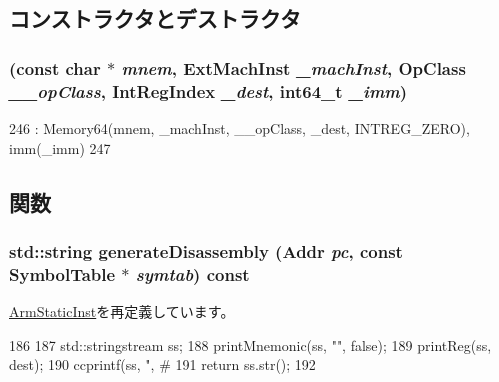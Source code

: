 \subsection{コンストラクタとデストラクタ}
\hypertarget{classArmISA_1_1MemoryLiteral64_a7025e91fe637b31678be253b3d3e6f69}{
\subsubsection[{MemoryLiteral64}]{ (const char $\ast$ {\em mnem}, \/  {\bf ExtMachInst} {\em \_\-machInst}, \/  OpClass {\em \_\-\_\-opClass}, \/  {\bf IntRegIndex} {\em \_\-dest}, \/  int64\_\-t {\em \_\-imm})}}
\label{classArmISA_1_1MemoryLiteral64_a7025e91fe637b31678be253b3d3e6f69}



\begin{DoxyCode}
246         : Memory64(mnem, _machInst, __opClass, _dest, INTREG_ZERO), imm(_imm)
247     {}
\end{DoxyCode}


\subsection{関数}
\hypertarget{classArmISA_1_1MemoryLiteral64_a95d323a22a5f07e14d6b4c9385a91896}{
\subsubsection[{generateDisassembly}]{\setlength{\rightskip}{0pt plus 5cm}std::string generateDisassembly ({\bf Addr} {\em pc}, \/  const SymbolTable $\ast$ {\em symtab}) const}}
\label{classArmISA_1_1MemoryLiteral64_a95d323a22a5f07e14d6b4c9385a91896}


\hyperlink{classArmISA_1_1ArmStaticInst_a95d323a22a5f07e14d6b4c9385a91896}{ArmStaticInst}を再定義しています。


\begin{DoxyCode}
186 {
187     std::stringstream ss;
188     printMnemonic(ss, "", false);
189     printReg(ss, dest);
190     ccprintf(ss, ", #%
191     return ss.str();
192 }
\end{DoxyCode}


